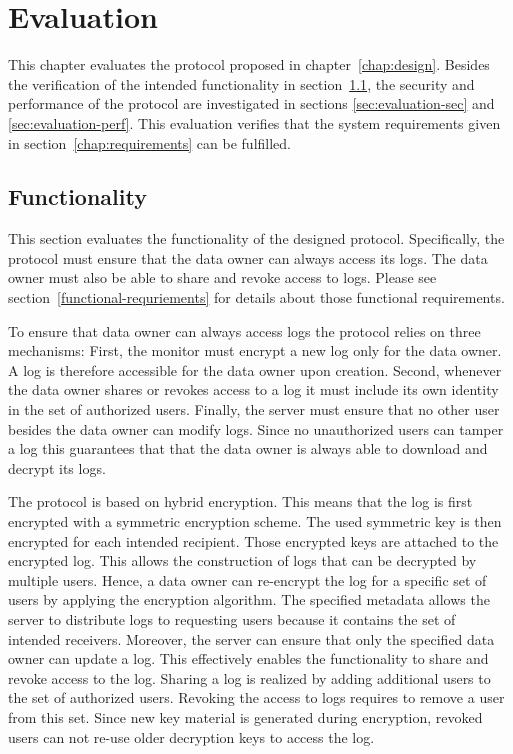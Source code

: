 \documentclass[../main.tex]{subfiles}
\begin{document}
\chapter{Evaluation}

This chapter evaluates the protocol proposed in chapter~\ref{chap:design}.
Besides the verification of the intended functionality in section~\ref{sec:evaluation-func}, the security and performance of the protocol are investigated in sections \ref{sec:evaluation-sec} and \ref{sec:evaluation-perf}.
This evaluation verifies that the system requirements given in section~\ref{chap:requirements} can be fulfilled.

\section{Functionality}
\label{sec:evaluation-func}

This section evaluates the functionality of the designed protocol.
Specifically, the protocol must ensure that the data owner can always access its logs.
The data owner must also be able to share and revoke access to logs.
Please see section~\ref{functional-requriements} for details about those functional requirements.

To ensure that data owner can always access logs the protocol relies on three mechanisms:
First, the monitor must encrypt a new log only for the data owner.
A log is therefore accessible for the data owner upon creation.
Second, whenever the data owner shares or revokes access to a log it must include its own identity in the set of authorized users.
Finally, the server must ensure that no other user besides the data owner can modify logs.
Since no unauthorized users can tamper a log this guarantees that that the data owner is always able to download and decrypt its logs.

The protocol is based on hybrid encryption.
This means that the log is first encrypted with a symmetric encryption scheme.
The used symmetric key is then encrypted for each intended recipient.
Those encrypted keys are attached to the encrypted log.
This allows the construction of logs that can be decrypted by multiple users.
Hence, a data owner can re-encrypt the log for a specific set of users by applying the encryption algorithm.
The specified metadata allows the server to distribute logs to requesting users because it contains the set of intended receivers.
Moreover, the server can ensure that only the specified data owner can update a log.
This effectively enables the functionality to share and revoke access to the log.
Sharing a log is realized by adding additional users to the set of authorized users.
Revoking the access to logs requires to remove a user from this set.
Since new key material is generated during encryption, revoked users can not re-use older decryption keys to access the log.
\end{document}
